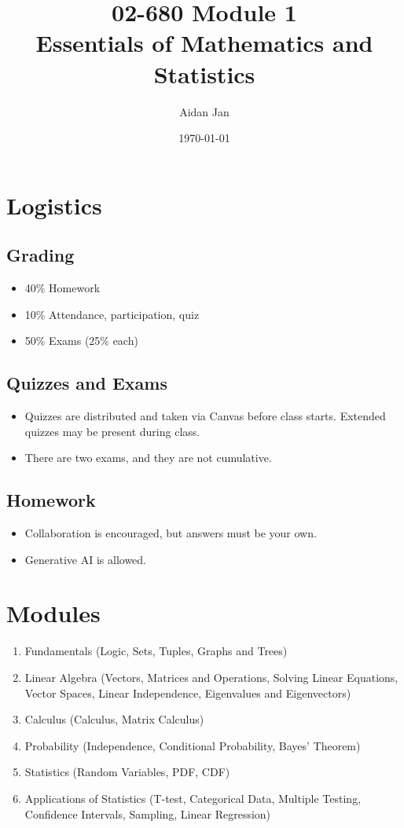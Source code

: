 \documentclass[10pt]{article}
\title{02-680 Module 1 \\ \large{Essentials of Mathematics and Statistics}}
\author{Aidan Jan}
\date{\today}
\begin{document}
\maketitle

\section*{Logistics}
\subsection*{Grading}
\begin{itemize}
	\item 40\% Homework
	\item 10\% Attendance, participation, quiz
	\item 50\% Exams (25\% each)
\end{itemize}
\subsection*{Quizzes and Exams}
\begin{itemize}
	\item Quizzes are distributed and taken via Canvas before class starts.  Extended quizzes may be present during class.
	\item There are two exams, and they are not cumulative.
\end{itemize}
\subsection*{Homework}
\begin{itemize}
	\item Collaboration is encouraged, but answers must be your own.
	\item Generative AI is allowed.
\end{itemize}

\section*{Modules}
\begin{enumerate}
	\item Fundamentals (Logic, Sets, Tuples, Graphs and Trees)
	\item Linear Algebra (Vectors, Matrices and Operations, Solving Linear Equations, Vector Spaces, Linear Independence, Eigenvalues and Eigenvectors)
	\item Calculus (Calculus, Matrix Calculus)
	\item Probability (Independence, Conditional Probability, Bayes' Theorem)
	\item Statistics (Random Variables, PDF, CDF)
	\item Applications of Statistics (T-test, Categorical Data, Multiple Testing, Confidence Intervals, Sampling, Linear Regression)
\end{enumerate}
\end{document}
